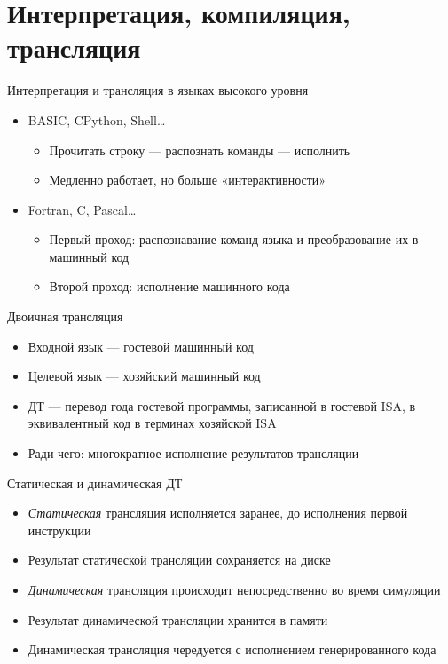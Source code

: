 \documentclass{beamer}
\begin{document}
\section{Интерпретация, компиляция, трансляция}

\begin{frame}{Интерпретация и трансляция в языках высокого уровня}
\begin{itemize}
\item BASIC, CPython, Shell\dots
    \begin{itemize}
    \item Прочитать строку — распознать команды — исполнить
    \item Медленно работает, но больше «интерактивности»
    \end{itemize}
\item Fortran, C, Pascal\dots
    \begin{itemize}
    \item Первый проход: распознавание команд языка и преобразование их в машинный код
    \item Второй проход: исполнение машинного кода
    \end{itemize}
\end{itemize}
\end{frame}

\begin{frame}{Двоичная трансляция}
\begin{itemize}
\item Входной язык — гостевой машинный код
\item Целевой язык — хозяйский машинный код
\item ДТ — перевод года гостевой программы, записанной в гостевой ISA, в эквивалентный код в терминах хозяйской ISA
\item Ради чего: многократное исполнение результатов трансляции
\end{itemize}
\end{frame}

\begin{frame}{Статическая и динамическая ДТ}
\begin{itemize}
    \item \textit{Статическая} трансляция исполняется заранее, до исполнения первой инструкции
    \item Результат статической трансляции сохраняется на диске
    \item \textit{Динамическая} трансляция происходит непосредственно во время симуляции
    \item Результат динамической трансляции хранится в памяти
    \item Динамическая трансляция чередуется с исполнением генерированного кода
\end{itemize}

\end{frame}
\end{document}
